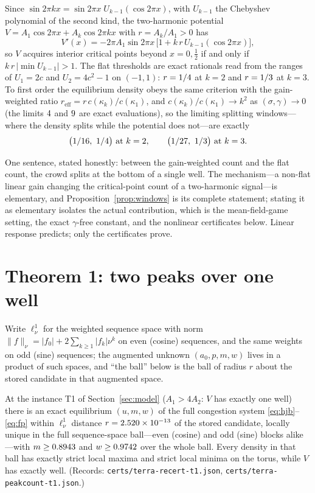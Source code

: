 \documentclass[11pt]{article}
\newcommand{\lnu}{\ell^1_\nu}
\begin{document}
\begin{proposition}\label{prop:windows}
Since $\sin 2\pi kx=\sin 2\pi x\;U_{k-1}(\cos 2\pi x)$, with $U_{k-1}$ the
Chebyshev polynomial of the second kind, the two-harmonic potential
$V=A_1\cos2\pi x+A_k\cos2\pi kx$ with $r=A_k/A_1>0$ has
\[
V'(x)=-2\pi A_1\sin 2\pi x\,\bigl[1+k\,r\,U_{k-1}(\cos 2\pi x)\bigr],
\]
so $V$ acquires interior critical points beyond $x=0,\tfrac12$ if and only if
$k\,r\,|\min U_{k-1}|>1$. The flat thresholds are exact rationals read from the
ranges of $U_1=2c$ and $U_2=4c^2-1$ on $(-1,1)$: $r=1/4$ at $k=2$
and $r=1/3$ at $k=3$. To first order the equilibrium density
obeys the same criterion with the gain-weighted ratio
$r_{\mathrm{eff}}=r\,c(\kappa_k)/c(\kappa_1)$, and
$c(\kappa_k)/c(\kappa_1)\to k^2$ as $(\sigma,\gamma)\to0$ (the limits
$4$ and $9$ are exact evaluations), so the limiting
splitting windows---where the density splits while the potential does not---are
exactly
\[
\bigl(1/16,\ 1/4\bigr)\ \text{at } k=2, \qquad
\bigl(1/27,\ 1/3\bigr)\ \text{at } k=3 .
\]
\end{proposition}

One sentence, stated honestly: between the gain-weighted count and the flat
count, the crowd splits at the bottom of a single well. The mechanism---a
non-flat linear gain changing the critical-point count of a two-harmonic
signal---is elementary, and Proposition~\ref{prop:windows} is its complete
statement; stating it as elementary isolates the actual contribution, which is
the mean-field-game setting, the exact $\gamma$-free constant, and the
nonlinear certificates below. Linear response predicts; only the certificates
prove.

\section{Theorem 1: two peaks over one well}\label{sec:two}

Write $\lnu$ for the weighted sequence space with norm
$\|f\|_\nu=|f_0|+2\sum_{k\ge1}|f_k|\nu^k$ on even (cosine) sequences, and the
same weights on odd (sine) sequences; the augmented unknown $(a_0,p,m,w)$ lives
in a product of such spaces, and ``the ball'' below is the ball of radius $r$
about the stored candidate in that augmented space.

\begin{theorem}\label{thm:two}
At the instance T1 of Section~\ref{sec:model} ($A_1>4A_2$: $V$ has exactly one
well) there is an exact equilibrium $(u,m,w)$ of the full congestion system
\eqref{eq:hjb}--\eqref{eq:fp} within $\lnu$ distance $r=2.520\times10^{-13}$ of the stored
candidate, locally unique in the full sequence-space ball---even (cosine) and
odd (sine) blocks alike---with $m\ge0.8943$ and $w\ge0.9742$ over the
whole ball. Every density in that ball has exactly \TOnePeaks{} strict local
maxima and \TOneMinima{} strict local minima on the torus, while $V$ has
exactly \TOneWells{} well. (Records: \texttt{certs/terra-recert-t1.json},
\texttt{certs/terra-peakcount-t1.json}.)
\end{theorem}
\end{document}
